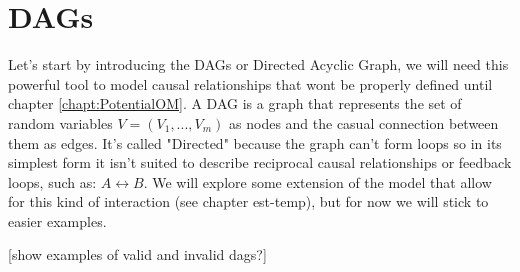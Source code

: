 \chapter{DAGs}
\label{chapt:DAGs}
Let's start by introducing the DAGs or Directed Acyclic Graph, we will need this powerful tool to model causal relationships that wont be properly defined until chapter \ref{chapt:PotentialOM}.
A DAG is a graph that represents the set of random variables $ V = (V_1,..., V_m)$ as nodes and the casual connection between them as edges. It's called "Directed" because the graph can't form loops so in its simplest form it isn't suited to describe reciprocal causal relationships or feedback loops, such as: $A \leftrightarrow B $. We will explore some extension of the model that allow for this kind of interaction (see chapter est-temp), but for now we will stick to easier examples.

[show examples of valid and invalid dags?]



%
%    		
%
%
%



